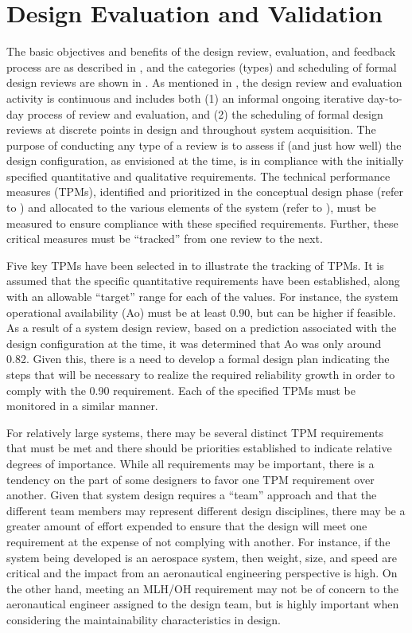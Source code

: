 \section{Design Evaluation and Validation}

The basic objectives and benefits of the design review, evaluation, and feedback process are as described in , and the categories (types) and scheduling of formal design reviews are shown in . As mentioned in , the design review and evaluation activity is continuous and includes both (1) an informal ongoing iterative day-to-day process of review and evaluation, and (2) the scheduling of formal design reviews at discrete points in design and throughout system acquisition. The purpose of conducting any type of a review is to assess if (and just how well) the design configuration, as envisioned at the time, is in compliance with the initially specified quantitative and qualitative requirements. The technical performance measures (TPMs), identified and prioritized in the conceptual design phase (refer to ) and allocated to the various elements of the system (refer to ), must be measured to ensure compliance with these specified requirements. Further, these critical measures must be ``tracked'' from one review to the next.

Five key TPMs have been selected in to illustrate the tracking of TPMs. It is assumed that the specific quantitative requirements have been established, along with an allowable “target” range for each of the values. For instance, the system operational availability (Ao) must be at least 0.90, but can be higher if feasible. As a result of a system design review, based on a prediction associated with the design configuration at the time, it was determined that Ao was only around 0.82. Given this, there is a need to develop a formal design plan indicating the steps that will be necessary to realize the required reliability growth in order to comply with the 0.90 requirement. Each of the specified TPMs must be monitored in a similar manner.

For relatively large systems, there may be several distinct TPM requirements that must be met and there should be priorities established to indicate relative degrees of importance. While all requirements may be important, there is a tendency on the part of some designers to favor one TPM requirement over another. Given that system design requires a ``team'' approach and that the different team members may represent different design disciplines, there may be a greater amount of effort expended to ensure that the design will meet one requirement at the expense of not complying with another. For instance, if the system being developed is an aerospace system, then weight, size, and speed are critical and the impact from an aeronautical engineering perspective is high. On the other hand, meeting an MLH/OH requirement may not be of concern to the aeronautical engineer assigned to the design team, but is highly important when considering the maintainability characteristics in design.

